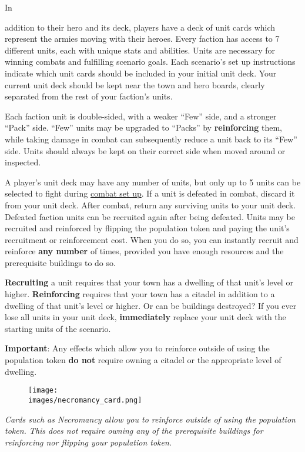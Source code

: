 \hypertarget{Units}{In} addition to their hero and its deck, players have a deck of unit cards which represent the armies moving with their heroes.
Every faction has access to 7 different units, each with unique stats and abilities.
Units are necessary for winning combats and fulfilling scenario goals.
Each scenario's set up instructions indicate which unit cards should be included in your initial unit deck.
Your current unit deck should be kept near the town and hero boards, clearly separated from the rest of your faction’s units.\par
Each faction unit is double-sided, with a weaker “Few” side, and a stronger “Pack” side.
“Few” units may be upgraded to “Packs” by \textbf{reinforcing} them, while taking damage in combat can subsequently reduce a unit back to its “Few” side.
Units should always be kept on their correct side when moved around or inspected.\par
A player’s unit deck may have any number of units, but only up to 5 units can be selected to fight during \hyperlink{Combatsetup}{combat set up}.
If a unit is defeated in combat, discard it from your unit deck.
After combat, return any surviving units to your unit deck.
Defeated faction units can be recruited again after being defeated.
Units may be recruited and reinforced by flipping the population token and paying the unit's recruitment  or reinforcement  cost.
When you do so, you can instantly recruit and reinforce \textbf{any number} of times, provided you have enough resources and the prerequisite buildings to do so.\par
\textbf{Recruiting} a unit requires that your town has a dwelling of that unit’s level or higher.
\textbf{Reinforcing} requires that your town has a citadel in addition to a dwelling of that unit’s level or higher.
Or can be buildings destroyed?
If you ever lose all units in your unit deck, \textbf{immediately} replace your unit deck with the starting units of the scenario.\par

\textbf{Important}: Any effects which allow you to reinforce outside of using the population token \textbf{do not} require owning a citadel or the appropriate level of dwelling.
\begin{figure}[h]
\centering
\texttt{[image: \\images/necromancy\_card.png]}
\end{figure}
\begin{center}
\textit{Cards such as Necromancy allow you to reinforce outside of using the population token.
This does not require owning any of the prerequisite buildings for reinforcing nor flipping your population token.}
\end{center}

